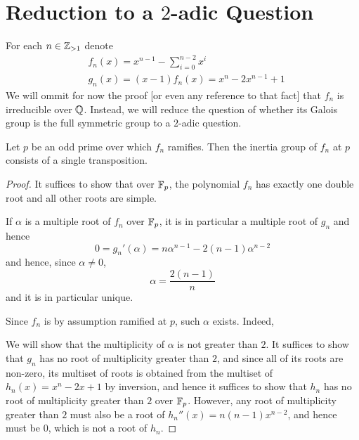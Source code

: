 \documentclass[../main.tex]{subfiles}
\begin{document}
\section{Reduction to a $2$-adic Question}
For each $n \in \mathbb{Z}_{> 1}$ denote 
\begin{align*}
  & f_n\left( x \right) = x^{n-1} - \sum_{i=0}^{n-2} x^i \\
  & g_n\left( x \right) = \left( x - 1 \right)f_n\left( x \right) = x^n - 2x^{n-1} + 1
\end{align*}
We will ommit for now the proof [or even any reference to that fact] that $f_n$ is irreducible over $\mathbb{Q}$.
Instead, we will reduce the question of whether its Galois group is the full symmetric group to a $2$-adic question.

\begin{lemma}
  Let $p$ be an odd prime over which $f_n$ ramifies.
  Then the inertia group of $f_n$ at $p$ consists of a single transposition.
\end{lemma}
\begin{proof}
  It suffices to show that over $\mathbb{F}_p$, the polynomial $f_n$ has exactly one double root and all other roots are simple.
  
  If $\alpha$ is a multiple root of $f_n$ over $\mathbb{F}_p$, it is in particular a multiple root of $g_n$ and hence
  \[
    0 = g_n'\left( \alpha \right) = n \alpha^{n-1} - 2\left( n - 1 \right) \alpha^{n-2} 
  \]
  and hence, since $\alpha \neq 0$,
  \[
    \alpha = \frac{2\left( n - 1 \right)}{n}
  \]
  and it is in particular unique.
  
  Since $f_n$ is by assumption ramified at $p$, such $\alpha$ exists.
  Indeed, 


  We will show that the multiplicity of $\alpha$ is not greater than $2$.
  It suffices to show that $g_n$ has no root of multiplicity greater than $2$, and since all of its roots are non-zero, its multiset of roots is obtained from the multiset of $h_n\left( x \right) = x^n - 2x + 1$ by inversion, and hence it suffices to show that $h_n$ has no root of multiplicity greater than $2$ over $\mathbb{F}_p$.
  However, any root of multiplicity greater than $2$ must also be a root of $h_n''\left( x \right) = n\left( n - 1 \right)x^{n-2}$, and hence must be $0$, which is not a root of $h_n$.
\end{proof}
\end{document}

